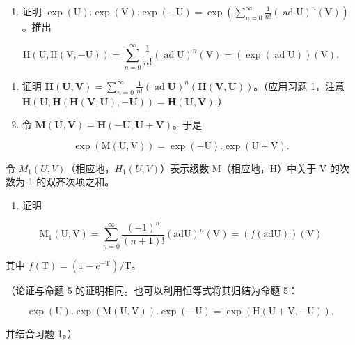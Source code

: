 
\begin{enumerate}
\def\labelenumi{\arabic{enumi}.}
\tightlist
\item
  证明 \(\exp (\mathrm{U}).\exp (\mathrm{V}).\exp (-\mathrm{U}) = \exp \left(\sum_{n = 0}^{\infty}\frac{1}{n!} (\operatorname {ad}\mathrm{U})^{n}(\mathrm{V})\right)\)。推出
\end{enumerate}

\[
\mathrm{H} (\mathrm{U}, \mathrm{H} (\mathrm{V}, - \mathrm{U})) = \sum_ {n = 0} ^ {\infty} \frac {1}{n !} (\operatorname{ad} \mathrm{U}) ^ {n} (\mathrm{V}) = (\exp (\operatorname{ad} \mathrm{U})) (\mathrm{V}).
\]

\begin{enumerate}
\def\labelenumi{\arabic{enumi}.}
\setcounter{enumi}{1}
\item
  证明 \(\mathbf{H}(\mathbf{U},\mathbf{V}) = \sum_{n = 0}^{\infty}\frac{1}{n!} (\operatorname {ad}\mathbf{U})^{n}(\mathbf{H}(\mathbf{V},\mathbf{U}))\)。（应用习题 1，注意 \(\mathbf{H}(\mathbf{U},\mathbf{H}(\mathbf{H}(\mathbf{V},\mathbf{U}), - \mathbf{U})) = \mathbf{H}(\mathbf{U},\mathbf{V}).\)）
\item
  令 \(\mathbf{M}(\mathbf{U},\mathbf{V}) = \mathbf{H}(-\mathbf{U},\mathbf{U} + \mathbf{V})\)。于是
\end{enumerate}

\[
\exp (\mathrm{M} (\mathrm{U}, \mathrm{V})) = \exp (- \mathrm{U}). \exp (\mathrm{U} + \mathrm{V}).
\]

令 \(M_{1}(U, V)\)（相应地，\(H_{1}(U, V)\)）表示级数 M（相应地，H）中关于 V 的次数为 1 的双齐次项之和。

\begin{enumerate}
\def\labelenumi{(\alph{enumi})}
\tightlist
\item
  证明
\end{enumerate}

\[
\mathrm{M} _ {1} (\mathrm{U}, \mathrm{V}) = \sum_ {n = 0} ^ {\infty} \frac {(- 1) ^ {n}}{(n + 1) !} (\mathrm{adU}) ^ {n} (\mathrm{V}) = (f (\mathrm{adU})) (\mathrm{V})
\]

其中 \(f(\mathrm{T}) = (1 - e^{-\mathrm{T}}) / \mathrm{T}\)。

（论证与命题 5 的证明相同。也可以利用恒等式将其归结为命题 5：

\[
\exp (\mathrm{U}). \exp (\mathrm{M} (\mathrm{U}, \mathrm{V})). \exp (- \mathrm{U}) = \exp (\mathrm{H} (\mathrm{U} + \mathrm{V}, - \mathrm{U})),
\]

并结合习题 1。）

